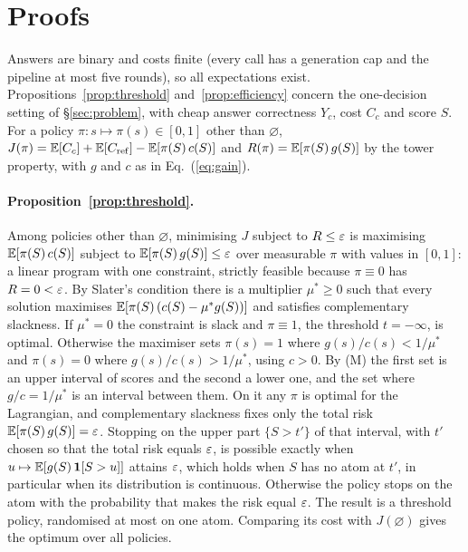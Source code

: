 \let\FloatBarrier\relax
\flushbottom\setlength{\parskip}{0pt plus 1.5pt}
\renewcommand{\topfraction}{0.85}\renewcommand{\dbltopfraction}{0.7}
\renewcommand{\textfraction}{0.1}\renewcommand{\floatpagefraction}{0.75}\renewcommand{\dblfloatpagefraction}{0.75}
\setcounter{topnumber}{3}\setcounter{dbltopnumber}{2}

\section{Proofs}
\label{app:proofs}

Answers are binary and costs finite (every call has a generation cap and the pipeline at most five rounds), so all expectations exist. Propositions~\ref{prop:threshold}
and~\ref{prop:efficiency} concern the one-decision setting of \S\ref{sec:problem}, with cheap answer
correctness $Y_c$, cost $C_c$ and score $S$. For a policy $\pi : s \mapsto \pi(s) \in [0,1]$ other than $\varnothing$,
$J(\pi) = \mathbb{E}[C_c] + \mathbb{E}[C_{\mathrm{ref}}] - \mathbb{E}[\pi(S)\,c(S)]$ and $R(\pi) = \mathbb{E}[\pi(S)\,g(S)]$ by the
tower property, with $g$ and $c$ as in Eq.~(\ref{eq:gain}).

\paragraph{Proposition~\ref{prop:threshold}.} Among policies other than $\varnothing$, minimising
$J$ subject to $R \le \varepsilon$ is maximising $\mathbb{E}[\pi(S)\,c(S)]$ subject to $\mathbb{E}[\pi(S)\,g(S)] \le \varepsilon$
over measurable $\pi$ with values in $[0,1]$: a linear program with one constraint, strictly
feasible because $\pi \equiv 0$ has $R = 0 < \varepsilon$. By Slater's condition there is a multiplier
$\mu^* \ge 0$ such that every solution maximises $\mathbb{E}[\pi(S)\,(c(S) - \mu^* g(S))]$ and satisfies
complementary slackness. If $\mu^* = 0$ the constraint is slack and $\pi \equiv 1$, the threshold
$t = -\infty$, is optimal. Otherwise the maximiser sets $\pi(s) = 1$ where
$g(s)/c(s) < 1/\mu^*$ and $\pi(s) = 0$ where $g(s)/c(s) > 1/\mu^*$, using $c > 0$. By (M) the
first set is an upper interval of scores and the second a lower one, and the set where
$g/c = 1/\mu^*$ is an interval between them. On it any $\pi$ is optimal for the Lagrangian, and
complementary slackness fixes only the total risk $\mathbb{E}[\pi(S)\,g(S)] = \varepsilon$. Stopping on the upper
part $\{S > t'\}$ of that interval, with $t'$ chosen so that the total risk equals $\varepsilon$, is
possible exactly when $u \mapsto \mathbb{E}[g(S)\,\mathbf{1}[S > u]]$ attains $\varepsilon$, which holds when $S$
has no atom at $t'$, in particular when its distribution is continuous. Otherwise the policy stops
on the atom with the probability that makes the risk equal $\varepsilon$. The result is a threshold
policy, randomised at most on one atom. Comparing its cost with $J(\varnothing)$ gives the optimum
over all policies.

